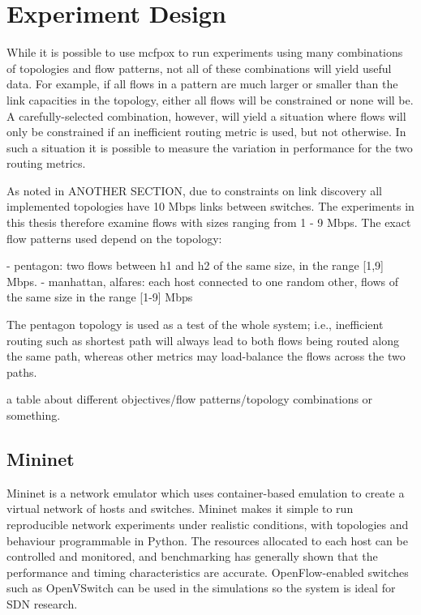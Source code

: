 \section{Experiment Design}
While it is possible to use mcfpox to run experiments using many combinations of topologies and flow patterns, not all of these combinations will yield useful data. For example, if all flows in a pattern are much larger or smaller than the link capacities in the topology, either all flows will be constrained or none will be. A carefully-selected combination, however, will yield a situation where flows will only be constrained if an inefficient routing metric is used, but not otherwise. In such a situation it is possible to measure the variation in performance for the two routing metrics.

As noted in ANOTHER SECTION, due to constraints on link discovery all implemented topologies have 10 Mbps links between switches. The experiments in this thesis therefore examine flows with sizes ranging from 1 - 9 Mbps. The exact flow patterns used depend on the topology:

- pentagon: two flows between h1 and h2 of the same size, in the range [1,9] Mbps.
- manhattan, alfares: each host connected to one random other, flows of the same size in the range [1-9] Mbps

The pentagon topology is used as a test of the whole system; i.e., inefficient routing such as shortest path will always lead to both flows being routed along the same path, whereas other metrics may load-balance the flows across the two paths.

a table about different objectives/flow patterns/topology combinations or something.

\subsection{Mininet}
Mininet is a network emulator which uses container-based emulation \cite{handigol:mininet} to create a virtual network of hosts and switches. Mininet makes it simple to run reproducible network experiments under realistic conditions, with topologies and behaviour programmable in Python. The resources allocated to each host can be controlled and monitored, and benchmarking \cite{handigol:benchmarks} has generally shown that the performance and timing characteristics are accurate. OpenFlow-enabled switches such as OpenVSwitch can be used in the simulations so the system is ideal for SDN research.



